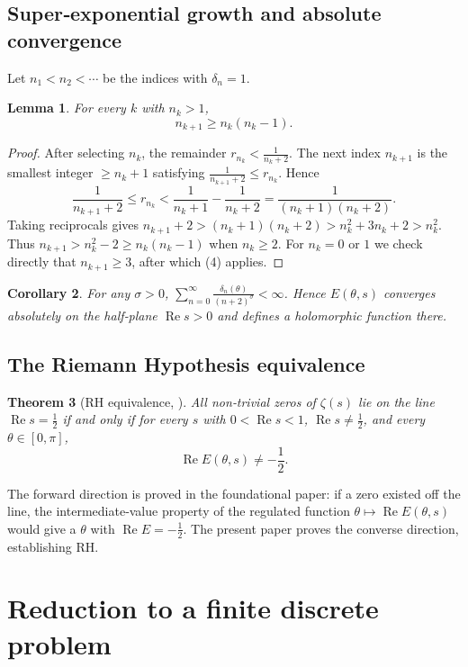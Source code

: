 \documentclass[11pt,a4paper]{article}
\newtheorem{theorem}{Theorem}[section]
\newtheorem{lemma}[theorem]{Lemma}
\newtheorem{corollary}[theorem]{Corollary}
\theoremstyle{definition}
\theoremstyle{remark}
\begin{document}
\subsection{Super‑exponential growth and absolute convergence}
Let \(n_1<n_2<\cdots\) be the indices with \(\delta_n=1\).

\begin{lemma}\label{lem:growth}
For every \(k\) with \(n_k>1\),
\[
n_{k+1} \ge n_k(n_k-1).
\tag{4}
\]
\end{lemma}
\begin{proof}
After selecting \(n_k\), the remainder \(r_{n_k}<\frac{1}{n_k+2}\).  The next index \(n_{k+1}\) is the smallest integer \(\ge n_k+1\) satisfying \(\frac{1}{n_{k+1}+2}\le r_{n_k}\).  Hence
\[
\frac{1}{n_{k+1}+2}\le r_{n_k} < \frac{1}{n_k+1}-\frac{1}{n_k+2}= \frac{1}{(n_k+1)(n_k+2)}.
\]
Taking reciprocals gives \(n_{k+1}+2 > (n_k+1)(n_k+2) > n_k^2+3n_k+2 > n_k^2\).  Thus \(n_{k+1} > n_k^2-2 \ge n_k(n_k-1)\) when \(n_k\ge 2\).  For \(n_k=0\) or \(1\) we check directly that \(n_{k+1}\ge 3\), after which (4) applies.
\end{proof}

\begin{corollary}\label{cor:abs}
For any \(\sigma>0\), \(\sum_{n=0}^{\infty}\frac{\delta_n(\theta)}{(n+2)^\sigma}<\infty\).  Hence \(E(\theta,s)\) converges absolutely on the half‑plane \(\operatorname{Re}s>0\) and defines a holomorphic function there.
\end{corollary}

\subsection{The Riemann Hypothesis equivalence}
\begin{theorem}[RH equivalence, \cite{GDSTfound}]\label{thm:RHequiv}
All non‑trivial zeros of \(\zeta(s)\) lie on the line \(\operatorname{Re}s=\frac12\) if and only if for every \(s\) with \(0<\operatorname{Re}s<1\), \(\operatorname{Re}s\neq\frac12\), and every \(\theta\in[0,\pi]\),
\[
\operatorname{Re}E(\theta,s)\neq -\frac12.
\tag{5}
\]
\end{theorem}
The forward direction is proved in the foundational paper: if a zero existed off the line, the intermediate‑value property of the regulated function \(\theta\mapsto\operatorname{Re}E(\theta,s)\) would give a \(\theta\) with \(\operatorname{Re}E=-\frac12\).  The present paper proves the converse direction, establishing RH.

\section{Reduction to a finite discrete problem}
\end{document}
